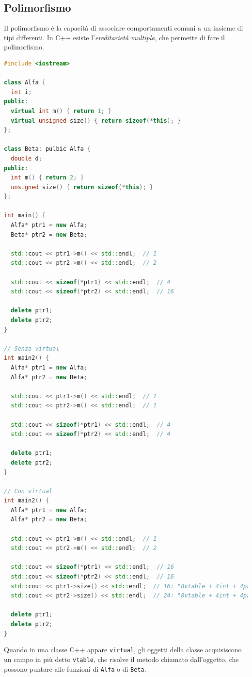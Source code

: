\documentclass[12pt]{article}
\begin{document}
\subsection{Polimorfismo}
Il polimorfismo \`e la capacit\`a di associare comportamenti comuni a un insieme di tipi differenti. In C++ esiste l'\emph{ereditariet\`a multipla}, che permette di fare il polimorfismo.
\begin{lstlisting}[language=c++]
#include <iostream>

class Alfa {
  int i;
public:
  virtual int m() { return 1; }
  virtual unsigned size() { return sizeof(*this); }
};

class Beta: pulbic Alfa {
  double d;
public:
  int m() { return 2; }
  unsigned size() { return sizeof(*this); }
};

int main() {
  Alfa* ptr1 = new Alfa;
  Beta* ptr2 = new Beta;

  std::cout << ptr1->m() << std::endl;  // 1
  std::cout << ptr2->m() << std::endl;  // 2

  std::cout << sizeof(*ptr1) << std::endl;  // 4
  std::cout << sizeof(*ptr2) << std::endl;  // 16

  delete ptr1;
  delete ptr2;
}

// Senza virtual
int main2() {
  Alfa* ptr1 = new Alfa;
  Alfa* ptr2 = new Beta;

  std::cout << ptr1->m() << std::endl;  // 1
  std::cout << ptr2->m() << std::endl;  // 1

  std::cout << sizeof(*ptr1) << std::endl;  // 4
  std::cout << sizeof(*ptr2) << std::endl;  // 4

  delete ptr1;
  delete ptr2;
}

// Con virtual
int main2() {
  Alfa* ptr1 = new Alfa;
  Alfa* ptr2 = new Beta;

  std::cout << ptr1->m() << std::endl;  // 1
  std::cout << ptr2->m() << std::endl;  // 2

  std::cout << sizeof(*ptr1) << std::endl;  // 16
  std::cout << sizeof(*ptr2) << std::endl;  // 16
  std::cout << ptr1->size() << std::endl;  // 16: "8vtable + 4int + 4padd"
  std::cout << ptr2->size() << std::endl;  // 24: "8vtable + 4int + 4padd + 8double"

  delete ptr1;
  delete ptr2;
}
\end{lstlisting}
Quando in una classe C++ appare \texttt{virtual}, gli oggetti della classe acquisiscono un campo in pi\`u detto \texttt{vtable}, che risolve il metodo chiamato dall'oggetto, che possono puntare alle funzioni di \texttt{Alfa} o di \texttt{Beta}.
\end{document}
